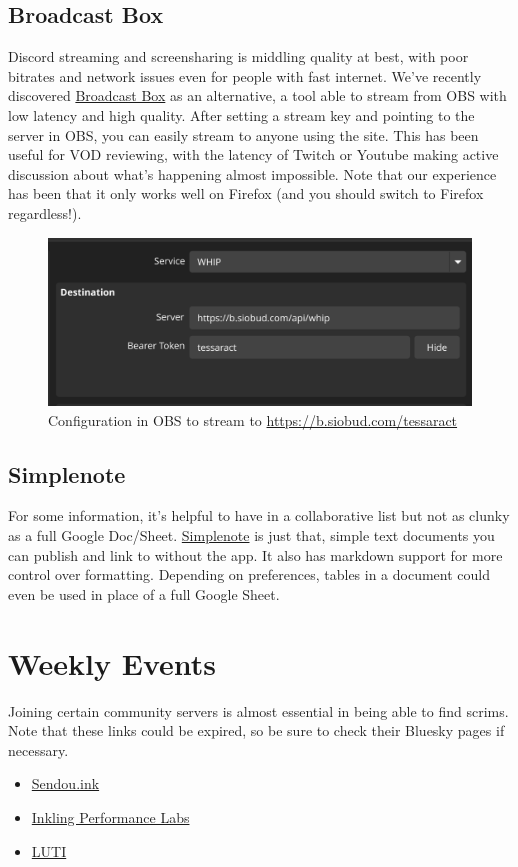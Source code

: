 \documentclass[12pt]{article}
\begin{document}
\subsection{Broadcast Box}
Discord streaming and screensharing is middling quality at best, with poor bitrates and network issues even for people with fast internet. We've recently discovered \href{https://github.com/glimesh/broadcast-box}{Broadcast Box} as an alternative, a tool able to stream from OBS with low latency and high quality. After setting a stream key and pointing to the server in OBS, you can easily stream to anyone using the site. This has been useful for VOD reviewing, with the latency of Twitch or Youtube making active discussion about what's happening almost impossible. Note that our experience has been that it only works well on Firefox (and you should switch to Firefox regardless!).
\begin{figure}[H]
    \centering
    \includegraphics[width=0.7\linewidth]{broadcastbox.png}
\caption{Configuration in OBS to stream to \href{https://b.siobud.com/tessaract}{https://b.siobud.com/tessaract}}
\end{figure}

\subsection{Simplenote}
For some information, it's helpful to have in a collaborative list but not as clunky as a full Google Doc/Sheet. \href{https://simplenote.com}{Simplenote} is just that, simple text documents you can publish and link to without the app. It also has markdown support for more control over formatting. Depending on preferences, tables in a document could even be used in place of a full Google Sheet.



\section{Weekly Events}
Joining certain community servers is almost essential in being able to find scrims. Note that these links could be expired, so be sure to check their Bluesky pages if necessary. 
\begin{itemize}
  \item \href{https://discord.com/invite/sendou}{Sendou.ink}
  \item \href{https://discord.gg/F7RaNUR}{Inkling Performance Labs}
  \item \href{https://discord.com/invite/0dZpaQB1mwcd2MCs}{LUTI}
\end{itemize}
\end{document}
